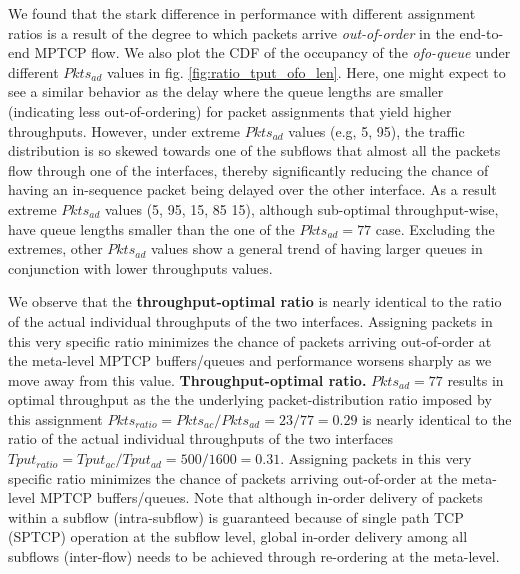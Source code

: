 We found that the stark difference in performance with different %
assignment ratios is a result of the degree to which packets arrive
\textit{out-of-order} in the end-to-end MPTCP flow. 
\fi
We also plot the CDF of the
occupancy of the \emph{ofo-queue} under different $Pkts_{ad}$
values in fig. \ref{fig:ratio_tput_ofo_len}. Here, one might expect to
see a similar behavior as the delay where the queue lengths are smaller
(indicating less out-of-ordering) for packet assignments that yield
higher throughputs. However, under extreme $Pkts_{ad}$ values
(e.g, 5, 95), the traffic distribution is so skewed towards one of
the subflows that almost all the packets flow through one of
the interfaces, thereby significantly reducing the chance of having an
in-sequence packet being delayed over the other interface. As a result
extreme $Pkts_{ad}$ values (5, 95, 15, 85 15), although sub-optimal
throughput-wise, have queue lengths smaller than the one of the $Pkts_{ad}=77$ case.
Excluding the extremes, other $Pkts_{ad}$ values show a general trend of
having larger queues in conjunction with lower throughputs values.
\fi

We observe that the 
\textbf{throughput-optimal ratio} is nearly identical to
the ratio of the actual individual throughputs of the two interfaces. Assigning packets in
this very specific ratio minimizes the chance of packets arriving
out-of-order at the meta-level MPTCP buffers/queues and performance worsens sharply as we
move away from this value. 
\noindent\textbf{Throughput-optimal ratio.} $Pkts_{ad}=77$ results in optimal throughput as the
the underlying packet-distribution ratio imposed by this assignment
$Pkts_{ratio}=Pkts_{ac}/Pkts_{ad}=23/77=0.29$ is nearly identical to
the ratio of the actual individual throughputs of the two interfaces
$Tput_{ratio}=Tput_{ac}/Tput_{ad}=500/1600=0.31$. Assigning packets in
this very specific ratio minimizes the chance of packets arriving
out-of-order at the meta-level MPTCP buffers/queues. 
\fi
{}
Note that
although in-order delivery of packets within a subflow (intra-subflow)
is guaranteed because of single path TCP (SPTCP) operation at the subflow level,
global in-order delivery among all subflows (inter-flow) needs
to be achieved through re-ordering at the meta-level.
\fi
